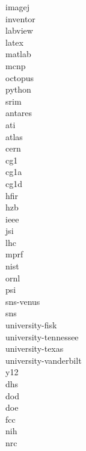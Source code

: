 \documentclass[../main.tex]{subfiles}%
\begin{document}
\gls{imagej}\\%
\gls{inventor}\\%
\gls{labview}\\%
\gls{latex}\\%
\gls{matlab}\\%
\gls{mcnp}\\%
\gls{octopus}\\%
\gls{python}\\%
\gls{srim}\\%
\gls{antares}\\%
\gls{ati}\\%
\gls{atlas}\\%
\gls{cern}\\%
\gls{cg1}\\%
\gls{cg1a}\\%
\gls{cg1d}\\%
\gls{hfir}\\%
\gls{hzb}\\%
\gls{ieee}\\%
\gls{jsi}\\%
\gls{lhc}\\%
\gls{mprf}\\%
\gls{nist}\\%
\gls{ornl}\\%
\gls{psi}\\%
\gls{sns-venus}\\%
\gls{sns}\\%
\gls{university-fisk}\\%
\gls{university-tennessee}\\%
\gls{university-texas}\\%
\gls{university-vanderbilt}\\%
\gls{y12}\\%
\gls{dhs}\\%
\gls{dod}\\%
\gls{doe}\\%
\gls{fcc}\\%
\gls{nih}\\%
\gls{nrc}\\%
\end{document}
